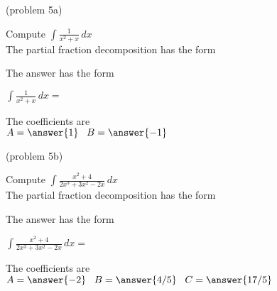 \documentclass[handout]{ximera}
\begin{document}
\begin{problem}(problem 5a)

Compute $\displaystyle{\int \frac{1}{x^2 + x}\, dx}$\\

The partial fraction decomposition has the form

\begin{multipleChoice}
\end{multipleChoice}

The answer has the form

$\displaystyle{\int \frac{1}{x^2 + x} \, dx =}$

\begin{multipleChoice}
\end{multipleChoice}

The coefficients are\\
$A = \answer{1} \;\;\; B = \answer{-1} \;\;\; $

\end{problem}



\begin{problem}(problem 5b)

Compute $\displaystyle{\int \frac{x^2 + 4}{2x^3 + 3x^2 - 2x}\, dx}$\\

The partial fraction decomposition has the form

\begin{multipleChoice}
\end{multipleChoice}

The answer has the form

$\displaystyle{\int \frac{x^2 + 4}{2x^3 + 3x^2 - 2x}\, dx =}$

\begin{multipleChoice}
\end{multipleChoice}

The coefficients are\\
$A = \answer{-2} \;\;\; B = \answer{4/5} \;\;\; C = \answer{17/5} $
\end{problem}
\end{document}
